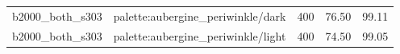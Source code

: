 \begin{longtable}{l>{\raggedright\arraybackslash}p{.42\linewidth}rrr}
b2000\_\allowbreak{}both\_\allowbreak{}s303 & %
palette:aubergine\_\allowbreak{}periwinkle/dark & %
400 & %
76.50 & %
99.11 \\ %

b2000\_\allowbreak{}both\_\allowbreak{}s303 & %
palette:aubergine\_\allowbreak{}periwinkle/light & %
400 & %
74.50 & %
99.05 \\ %


\end{longtable}
